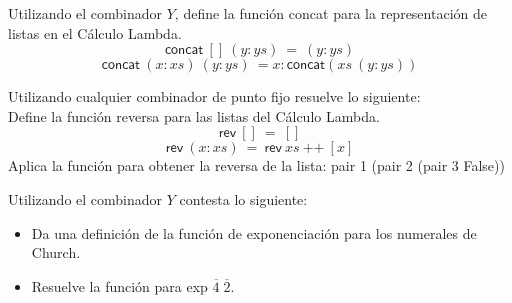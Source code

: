 \bigskip

                \begin{exercise}
                    Utilizando el combinador $Y$, define la función \textsf{concat} para la representación de listas en el Cálculo Lambda.
                    \[
                        \textsf{concat}\ []\ (y:ys)\ =\ (y:ys)
                    \]
                    \[
                        \textsf{concat}\ (x:xs)\ (y:ys)\ = x:\textsf{concat}(xs\ (y:ys))
                    \]
                \end{exercise}

\bigskip

                \begin{exercise}
                    Utilizando cualquier combinador de punto fijo resuelve lo siguiente:\\
                    
                    Define la función reversa para las listas del Cálculo Lambda. \\
                    \[
                        \textsf{rev}\ []\ =\ []
                    \]
                    \[
                        \textsf{rev}\ (x:xs)\ =\ \textsf{rev}\ xs\ \text{++}\ [x]
                    \]
                    Aplica la función para obtener la reversa de la lista: pair 1 (pair 2 (pair 3 False))
                \end{exercise}

\bigskip

                \begin{exercise}
                    Utilizando el combinador $Y$ contesta lo siguiente: \\
                    \begin{itemize}
                    	\item Da una definición de la función de exponenciación para los numerales de Church.
                    	\item Resuelve la función para \textsf{exp} $\overline{4} \; \overline{2}$.
		    \end{itemize}
                \end{exercise}

%

                    
            